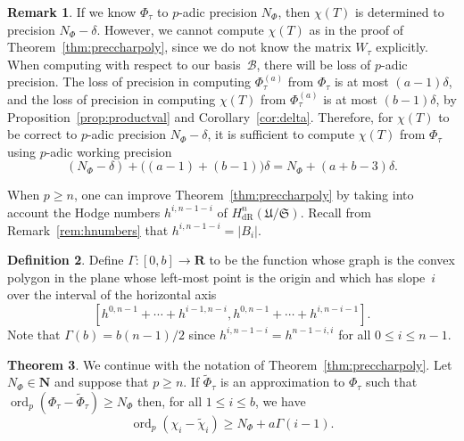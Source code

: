\documentclass[a4paper,11pt]{article}
\numberwithin{equation}{section}
\providecommand{\card}[1]{\lvert#1\rvert}                %
\newcommand{\NN}{\mathbf{N}} %
\newcommand{\RR}{\mathbf{R}} %
\DeclareMathOperator{\ord}{ord}          %
\providecommand{\HdR}{H_{\text{dR}}}    %
\providecommand{\cB}{\mathcal{B}} %
\theoremstyle{definition}
\newtheorem{thm}{Theorem}[section]
\newtheorem{defn}[thm]{Definition}
\newtheorem{rem}[thm]{Remark}
\begin{document}
\begin{rem} \label{rem:workprecchi}
If we know $\Phi_{\tau}$ to $p$-adic precision $N_{\Phi}$, then
$\chi(T)$ is determined to precision $N_{\Phi}-\delta$.
However, we cannot compute $\chi(T)$ as in the proof of 
Theorem~\ref{thm:preccharpoly}, since we do not know the matrix 
$W_{\tau}$ explicitly. When computing with respect to our basis~$\cB$,
there will be loss of $p$-adic precision. The loss of precision 
in computing $\Phi_{\tau}^{(a)}$ from $\Phi_{\tau}$ is at most 
$(a-1)\delta$, and the loss of 
precision in computing $\chi(T)$ from $\Phi_{\tau}^{(a)}$ 
is at most $(b-1) \delta$, by Proposition~\ref{prop:productval} and 
Corollary~\ref{cor:delta}. Therefore, for $\chi(T)$ to be correct
to $p$-adic precision $N_{\Phi}-\delta$, it is sufficient to compute 
$\chi(T)$ from $\Phi_{\tau}$ using $p$-adic working precision 
\[
(N_{\Phi}-\delta)+\bigl((a-1)+(b-1)\bigr)\delta = N_{\Phi}+(a+b-3)\delta.
\] 
\end{rem}

When $p \geq n$, one can improve Theorem~\ref{thm:preccharpoly} by taking into 
account the Hodge numbers $h^{i,n-1-i}$ of $\HdR^{n}(\mathfrak{U}/\mathfrak{S})$.
Recall from Remark~\ref{rem:hnumbers} that $h^{i,n-1-i}=\card{B_i}$.

\begin{defn}
Define $\Gamma \colon [0,b] \rightarrow \RR$ to be the function whose graph 
is the convex polygon in the plane whose left-most point is the origin and 
which has slope~$i$ over the interval of the horizontal axis 
\[
\left[h^{0,n-1} + \dotsb + h^{i-1,n-i}, h^{0,n-1} + \dotsb + h^{i,n-i-1}\right].
\]
Note that $\Gamma(b)=b(n-1)/2$ since $h^{i,n-1-i}=h^{n-1-i,i}$ for all $0 \leq i \leq n-1$.
\end{defn}

\begin{thm} \label{thm:pgeqn}
We continue with the notation of Theorem~\ref{thm:preccharpoly}. 
Let \mbox{$N_{\Phi} \in \NN$} and suppose that $p \geq n$. If $\tilde{\Phi}_{\tau}$ 
is an approximation to $\Phi_{\tau}$ such that $\ord_p (\Phi_{\tau}-\tilde{\Phi}_{\tau}) \geq N_{\Phi}$ 
then, for all $1 \leq i \leq b$, we have
\[
\ord_p\left(\chi_i-\tilde{\chi}_i\right) \geq N_{\Phi} + a\Gamma(i-1).
\]
\end{thm}
 
\end{document}
